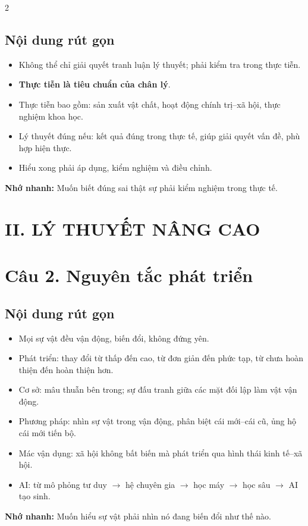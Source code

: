 \documentclass[9pt,a4paper]{extarticle}
\begin{document}
\begin{multicols*}{2}
\subsection*{Nội dung rút gọn}
\begin{itemize}
  \item Không thể chỉ giải quyết tranh luận lý thuyết; phải kiểm tra trong thực tiễn.
  \item \textbf{Thực tiễn là tiêu chuẩn của chân lý}.
  \item Thực tiễn bao gồm: sản xuất vật chất, hoạt động chính trị--xã hội, thực nghiệm khoa học.
  \item Lý thuyết đúng nếu: kết quả đúng trong thực tế, giúp giải quyết vấn đề, phù hợp hiện thực.
  \item Hiểu xong phải áp dụng, kiểm nghiệm và điều chỉnh.
\end{itemize}
\textbf{Nhớ nhanh:} Muốn biết đúng sai thật sự phải kiểm nghiệm trong thực tế.

\section*{II. LÝ THUYẾT NÂNG CAO}

\section*{Câu 2. Nguyên tắc phát triển}
\subsection*{Nội dung rút gọn}
\begin{itemize}
  \item Mọi sự vật đều vận động, biến đổi, không đứng yên.
  \item Phát triển: thay đổi từ thấp đến cao, từ đơn giản đến phức tạp, từ chưa hoàn thiện đến hoàn thiện hơn.
  \item Cơ sở: mâu thuẫn bên trong; sự đấu tranh giữa các mặt đối lập làm vật vận động.
  \item Phương pháp: nhìn sự vật trong vận động, phân biệt cái mới--cái cũ, ủng hộ cái mới tiến bộ.
  \item Mác vận dụng: xã hội không bất biến mà phát triển qua hình thái kinh tế--xã hội.
  \item AI: từ mô phỏng tư duy $\to$ hệ chuyên gia $\to$ học máy $\to$ học sâu $\to$ AI tạo sinh.
\end{itemize}
\textbf{Nhớ nhanh:} Muốn hiểu sự vật phải nhìn nó đang biến đổi như thế nào.


\end{multicols*}
\end{document}

